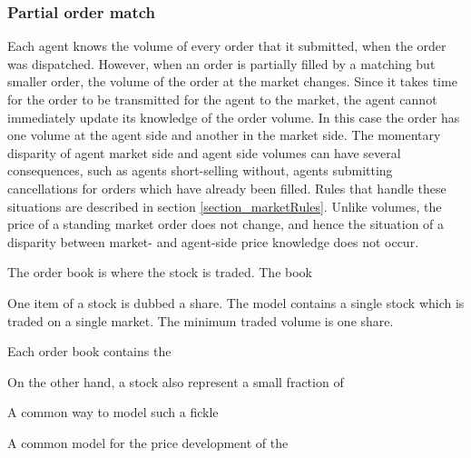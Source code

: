 \subsubsection{Partial order match}
Each agent knows the volume of every order that it submitted, when the order was dispatched. However, when an order is partially filled by a matching but smaller order, the volume of the order at the market changes. Since it takes time for the order to be transmitted for the agent to the market, the agent cannot immediately update its knowledge of the order volume. In this case the order has one volume at the agent side and another in the market side. The momentary disparity of agent market side and agent side volumes can have several consequences, such as agents short-selling without, agents submitting cancellations for orders which have already been filled. Rules that handle these situations are described in section \ref{section_marketRules}. Unlike volumes, the price of a standing market order does not change, and hence the situation of a disparity between market- and agent-side price knowledge does not occur.




The order book is where the stock is traded. The book 






 One item of a stock is dubbed a share. The model contains a single stock which is traded on a single market. 
The minimum traded volume is one share. 



Each order book contains the 


 On the other hand, a stock also represent a small fraction of 

 A common way to model such a fickle 
 
 A common model for the price development of the 
